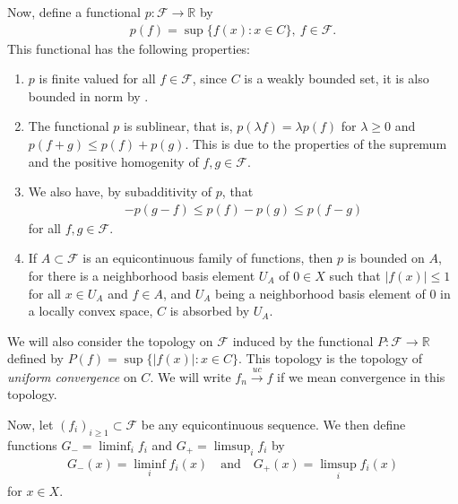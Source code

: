 \documentclass[10pt,twoside,openany,final]{memoir}
\theoremstyle{break}
\theoremstyle{Break}
\newcommand{\R}{\mathbb{R}}
\begin{document}
Now, define a functional $p\colon \mathcal{F} \to \R$ by 
\begin{align*}
p(f)=\sup\{f(x): x \in C \}, \ f \in \mathcal{F}.
\end{align*}
This functional has the following properties:
\begin{enumerate}
\item $p$ is finite valued for all $f \in \mathcal{F}$, since $C$ is a weakly bounded set, it is also bounded in norm by .
\item The functional $p$ is sublinear, that is, $p(\lambda f)=\lambda p(f)$ for $\lambda\geq 0$ and $p(f+g) \leq p(f)+ p(g)$. This is due to the properties of the supremum and the positive homogenity of $f,g \in \mathcal{F}$.
\item We also have, by subadditivity of $p$, that
\begin{align*} 
-p(g-f) \leq p(f)-p(g) \leq p(f-g)
\end{align*}
for all $f,g \in \mathcal{F}$.
\item If $A \subset \mathcal{F}$ is an equicontinuous family of functions, then $p$ is bounded on $A$, for there is a neighborhood basis element $U_{A}$ of $0\in X$ such that $|f(x)| \leq 1$ for all $x\in U_{A}$ and $f \in A$, and $U_{A}$ being a neighborhood basis element of $0$ in a locally convex space, $C$ is absorbed by $U_{A}$.
\end{enumerate}
We will also consider the topology on $\mathcal{F}$ induced by the functional $P:\mathcal{F} \to \R$ defined by $P(f)=\sup\{|f(x)|:x \in C\}$. This topology is the topology of \textit{uniform convergence} on $C$. We will write $f_{n} \stackrel{uc}{\to}f$ if we mean convergence in this topology.

Now, let $(f_{i})_{i\geq 1} \subset \mathcal{F}$ be any equicontinuous sequence. We then define functions $\displaystyle G_{-}=\liminf_{i}f_{i}$ and $\displaystyle G_{+}=\limsup_{i}f_{i}$ by
\begin{align*}
G_{-}(x)=\liminf_{i}f_{i}(x)\quad \text{and} \quad G_{+}(x)=\limsup_{i}f_{i}(x)
\end{align*} 
for $x \in X$.
\end{document}
